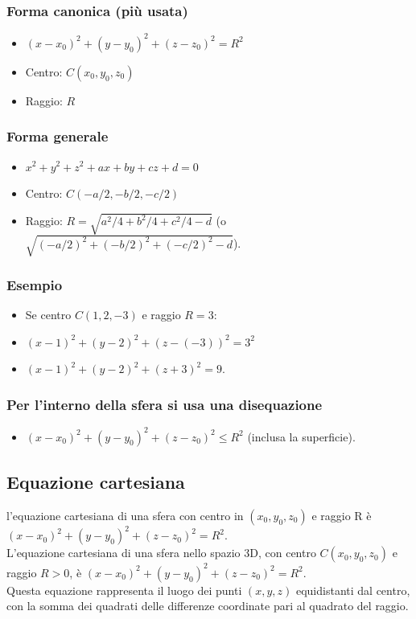 \documentclass[a4paper,14pt]{article}
\begin{document}
\subsubsection{Forma canonica (più usata)}
\begin{itemize}
\item \((x-x_{0})^{2}+(y-y_{0})^{2}+(z-z_{0})^{2}=R^{2}\)
\item Centro:  \(C(x_{0},y_{0},z_{0})\)
\item Raggio:  \(R\)
\end{itemize}
\subsubsection{Forma generale}
\begin{itemize}
\item \(x^{2}+y^{2}+z^{2}+ax+by+cz+d=0\)
\item Centro:  \(C(-a/2,-b/2,-c/2)\)
\item Raggio:  \(R=\sqrt{a^{2}/4+b^{2}/4+c^{2}/4-d}\) (o \(\sqrt{(-a/2)^{2}+(-b/2)^{2}+(-c/2)^{2}-d}\)).
\end{itemize}
\subsubsection{Esempio}
\begin{itemize}
\item Se centro \(C(1,2,-3)\) e raggio \(R=3\):
\item \((x-1)^{2}+(y-2)^{2}+(z-(-3))^{2}=3^{2}\)
\item \((x-1)^{2}+(y-2)^{2}+(z+3)^{2}=9\).\\
\end{itemize}
\subsubsection{Per l'interno della sfera si usa una disequazione}
\begin{itemize}
\item \((x-x_{0})^{2}+(y-y_{0})^{2}+(z-z_{0})^{2}\le R^{2}\) (inclusa la superficie).
\end{itemize}
\subsection{Equazione cartesiana} l'equazione cartesiana di una sfera con centro in \( (x_0, y_0, z_0) \) e raggio R è \\
\( (x - x_0)^2 + (y - y_0)^2 + (z - z_0)^2 = R^2. \) \\
L'equazione cartesiana di una sfera nello spazio 3D, con centro \(C(x_{0},y_{0},z_{0})\) e raggio \(R>0\), è \((x-x_{0})^{2}+(y-y_{0})^{2}+(z-z_{0})^{2}=R^{2}\). \\
Questa equazione rappresenta il luogo dei punti \((x,y,z)\) equidistanti dal centro, con la somma dei quadrati delle differenze coordinate pari al quadrato del raggio.
\end{document}

